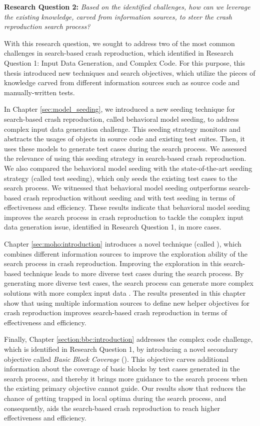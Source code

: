\textbf{Research Question 2: }\textit{Based on the identified challenges, how can we leverage the existing knowl\-edge, carved from information sources, to steer the crash reproduction search process?}


With this research question, we sought to address two of the most common challenges in search-based crash reproduction, which identified in Research Question 1: Input Data Generation, and Complex Code. For this purpose, this thesis introduced new techniques and search objectives, which utilize the pieces of knowledge carved from different information sources such as source code and manually-written tests.

In Chapter \ref{sec:model_seeding}, we introduced a new seeding technique for search-based crash reproduction, called behavioral model seeding, to address complex input data generation challenge. This seeding strategy monitors and abstracts the usages of objects in source code and existing test suites. Then, it uses these models to generate test cases during the search process.
We assessed the relevance of using this seeding strategy in search-based crash reproduction. We also compared the behavioral model seeding with the state-of-the-art seeding strategy (called test seeding), which only seeds the existing test cases to the search process. We witnessed that behavioral model seeding outperforms search-based crash reproduction without seeding and with test seeding in terms of effectiveness and efficiency. These results indicate that behavioral model seeding improves the search process in crash reproduction to tackle the complex input data generation issue, identified in Research Question 1, in more cases.

Chapter \ref{sec:moho:introduction} introduces a novel technique (called \moho), which combines different information sources to improve the exploration ability of the search process in crash reproduction. Improving the exploration in this search-based technique leads to more diverse test cases during the search process. By generating more diverse test cases, the search process can generate more complex solutions with more complex input data \cite{jensen2004helper}. The results presented in this chapter show that using multiple information sources to define new helper objectives for crash reproduction improves search-based crash reproduction in terms of effectiveness and efficiency.

Finally, Chapter \ref{section:bbc:introduction} addresses the complex code challenge, which is identified in Research Question 1, by introducing a novel secondary objective called \textit{Basic Block Coverage} (\bbc). This objective carves additional information about the coverage of basic blocks by test cases generated in the search process, and thereby it brings more guidance to the search process when the existing primary objective cannot guide. Our results show that \bbc reduces the chance of getting trapped in local optima during the search process, and consequently, aids the search-based crash reproduction to reach higher effectiveness and efficiency.

